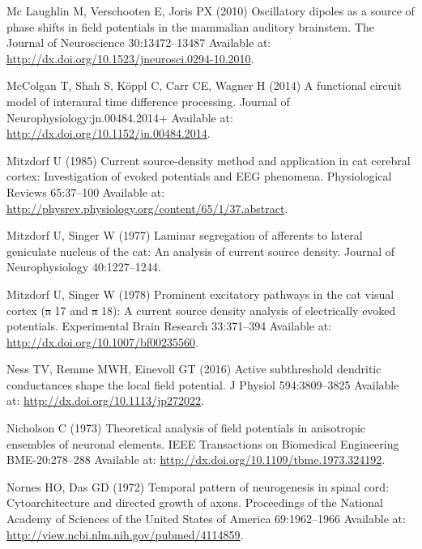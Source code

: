\documentclass[]{article}
\providecommand{\DIFaddtex}[1]{{\protect\color{blue}\uwave{#1}}} %
\providecommand{\DIFdeltex}[1]{{\protect\color{red}\sout{#1}}}                      %
\providecommand{\DIFaddbegin}{} %
\providecommand{\DIFaddend}{} %
\providecommand{\DIFdelbegin}{} %
\providecommand{\DIFdelend}{} %
\providecommand{\DIFadd}[1]{\texorpdfstring{\DIFaddtex{#1}}{#1}} %
\providecommand{\DIFdel}[1]{\texorpdfstring{\DIFdeltex{#1}}{}} %
\begin{document}
\hypertarget{ref-McLaughlin2010Oscillatory}{}
Mc Laughlin M, Verschooten E, Joris PX (2010) Oscillatory dipoles as a
source of phase shifts in field potentials in the mammalian auditory
brainstem. The Journal of Neuroscience 30:13472--13487 Available at:
\url{http://dx.doi.org/10.1523/jneurosci.0294-10.2010}.

\hypertarget{ref-McColgan2014Functional}{}
McColgan T, Shah S, Köppl C, Carr CE, Wagner H (2014) A functional
circuit model of interaural time difference processing. Journal of
Neurophysiology:jn.00484.2014+ Available at:
\url{http://dx.doi.org/10.1152/jn.00484.2014}.

\hypertarget{ref-Mitzdorf1985Current}{}
Mitzdorf U (1985) Current source-density method and application in cat
cerebral cortex: Investigation of evoked potentials and EEG phenomena.
Physiological Reviews 65:37--100 Available at:
\url{http://physrev.physiology.org/content/65/1/37.abstract}.

\hypertarget{ref-Mitzdorf1977Laminar}{}
Mitzdorf U, Singer W (1977) Laminar segregation of afferents to lateral
geniculate nucleus of the cat: An analysis of current source density.
Journal of Neurophysiology 40:1227--1244.

\hypertarget{ref-Mitzdorf1978Prominent}{}
Mitzdorf U, Singer W (1978) Prominent excitatory pathways in the cat
visual cortex (\DIFdelbegin \DIFdel{a }\DIFdelend \DIFaddbegin \DIFadd{A }\DIFaddend 17 and \DIFdelbegin \DIFdel{a }\DIFdelend \DIFaddbegin \DIFadd{A }\DIFaddend 18): A current source density analysis of
electrically evoked potentials. Experimental Brain Research 33:371--394
Available at: \url{http://dx.doi.org/10.1007/bf00235560}.

\hypertarget{ref-Ness2016Active}{}
Ness TV, Remme MWH, Einevoll GT (2016) Active subthreshold dendritic
conductances shape the local field potential. J Physiol 594:3809--3825
Available at: \url{http://dx.doi.org/10.1113/jp272022}.

\hypertarget{ref-Nicholson1973Theoretical}{}
Nicholson C (1973) Theoretical analysis of field potentials in
anisotropic ensembles of neuronal elements. IEEE Transactions on
Biomedical Engineering BME-20:278--288 Available at:
\url{http://dx.doi.org/10.1109/tbme.1973.324192}.

\hypertarget{ref-Nornes1972Temporal}{}
Nornes HO, Das GD (1972) Temporal pattern of neurogenesis in spinal
cord: Cytoarchitecture and directed growth of axons. Proceedings of the
National Academy of Sciences of the United States of America
69:1962--1966 Available at:
\url{http://view.ncbi.nlm.nih.gov/pubmed/4114859}.
\end{document}
